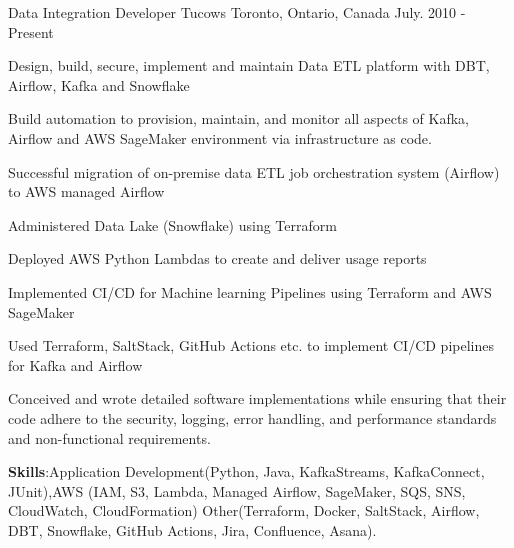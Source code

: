 

\begin{cventries}

  \cventry
    {Data Integration Developer} %
    {Tucows} %
    {Toronto, Ontario, Canada} %
    {July. 2010 - Present} %
    {
      \begin{cvitems} %
        \item {Design, build, secure, implement and maintain Data ETL platform with DBT, Airflow, Kafka and Snowflake}
        \item {Build automation to provision, maintain, and monitor all aspects of Kafka, Airflow and AWS SageMaker  environment via infrastructure as code.}
        \item {Successful  migration of on-premise data ETL job orchestration system (Airflow) to AWS managed Airflow}
        \item {Administered Data Lake (Snowflake) using Terraform}
        \item {Deployed AWS Python Lambdas to create and deliver usage reports }
        \item {Implemented CI/CD for Machine learning Pipelines using Terraform and AWS SageMaker}
        \item { Used Terraform, SaltStack, GitHub Actions etc. to implement CI/CD pipelines for Kafka and Airflow}
        \item {Conceived and wrote detailed software implementations while ensuring that their code adhere to the security, logging, error handling, and performance standards and non-functional requirements.}
        \vspace{1mm} %
        \item {\textbf{Skills}:Application Development(Python, Java, KafkaStreams, KafkaConnect, JUnit),AWS (IAM, S3, Lambda, Managed Airflow, SageMaker, SQS, SNS, CloudWatch, CloudFormation) Other(Terraform, Docker, SaltStack, Airflow, DBT, Snowflake, GitHub Actions, Jira, Confluence, Asana).}
      \end{cvitems}
    }
    \vspace{5mm} %

\end{cventries}
